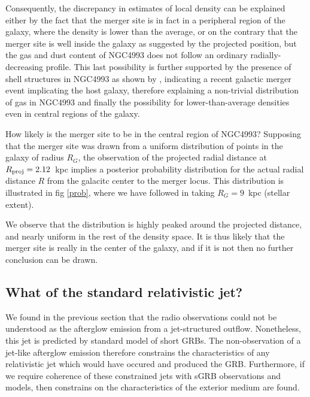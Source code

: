 Consequently, the discrepancy in estimates of local density can be explained either by the fact that the merger site is in fact in a peripheral region of the galaxy, where the density is lower than the average, or on the contrary that the merger site is well inside the galaxy as suggested by the projected position, but the gas and dust content of NGC4993 does not follow an ordinary radially-decreasing profile. This last possibility is further supported by the presence of shell structures in NGC4993 as shown by \cite{33}, indicating a recent galactic merger event implicating the host galaxy, therefore explaining a non-trivial distribution of gas in NGC4993 and finally the possibility for lower-than-average densities even in central regions of the galaxy.

How likely is the merger site to be in the central region of NGC4993? Supposing that the merger site was drawn from a uniform distribution of points in the galaxy of radius $R_G$, the observation of the projected radial distance at $R_\rm{proj} = 2.12$~kpc implies a posterior probability distribution for the actual radial distance $R$ from the galacitc center to the merger locus. This distribution is illustrated in fig \ref{prob}, where we have followed \cite{12} in taking $R_G = 9$~kpc (stellar extent).


We observe that the distribution is highly peaked around the projected distance, and nearly uniform in the rest of the density space. It is thus likely that the merger site is really in the center of the galaxy, and if it is not then no further conclusion can be drawn.






\subsection{What of the standard relativistic jet?}

We found in the previous section that the radio observations could not be understood as the afterglow emission from a jet-structured outflow. Nonetheless, this jet is predicted by standard model of short GRBs. The non-observation of a jet-like afterglow emission therefore constrains the characteristics of any relativistic jet which would have occured and produced the GRB. Furthermore, if we require coherence of these constrained jets with sGRB observations and models, then constrains on the characteristics of the exterior medium are found.

